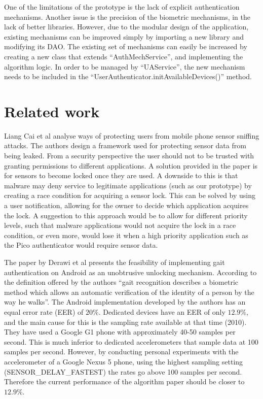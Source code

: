 One of the limitations of the prototype is the lack of explicit authentication mechanisms. Another issue is the precision of the biometric mechanisms, in the lack of better libraries. However, due to the modular design of the application, existing mechanisms can be improved simply by importing a new library and modifying its DAO. The existing set of mechanisms can easily be increased by creating a new class that extends ``AuthMechService'', and implementing the algorithm logic. In order to be managed by ``UAService'', the new mechanism needs to be included in the ``UserAuthenticator.initAvailableDevices()'' method.

\section{Related work}
Liang Cai et al \cite{cai2009defending} analyse ways of protecting users from mobile phone sensor sniffing attacks. The authors design a framework used for protecting sensor data from being leaked. From a security perspective the user should not to be trusted with granting permissions to different applications. A solution provided in the paper is for sensors to become locked once they are used. A downside to this is that malware may deny service to legitimate applications (such as our prototype) by creating a race condition for acquiring a sensor lock. This can be solved by using a user notification, allowing for the owner to decide which application acquires the lock. A suggestion to this approach would be to allow for different priority levels, such that malware applications would not acquire the lock in a race condition, or even more, would lose it when a high priority application such as the Pico authenticator would require sensor data.

The paper by Derawi et al \cite{derawi2010unobtrusive} presents the feasibility of implementing gait authentication on Android as an unobtrusive unlocking mechanism. According to the definition offered by the authors ``gait recognition describes a biometric method which allows an automatic verification of the identity of a person by the way he walks''. The Android implementation developed by the authors has an equal error rate (EER) of $20\%$. Dedicated devices have an EER of only $12.9\%$, and the main cause for this is the sampling rate available at that time (2010). They have used a Google G1 phone with approximately 40-50 samples per second. This is much inferior to dedicated accelerometers that sample data at 100 samples per second. However, by conducting personal experiments with the accelerometer of a Google Nexus 5 phone, using the highest sampling setting (SENSOR\_DELAY\_FASTEST) the rates go above 100 samples per second. Therefore the current performance of the algorithm paper should be closer to $12.9\%$.

